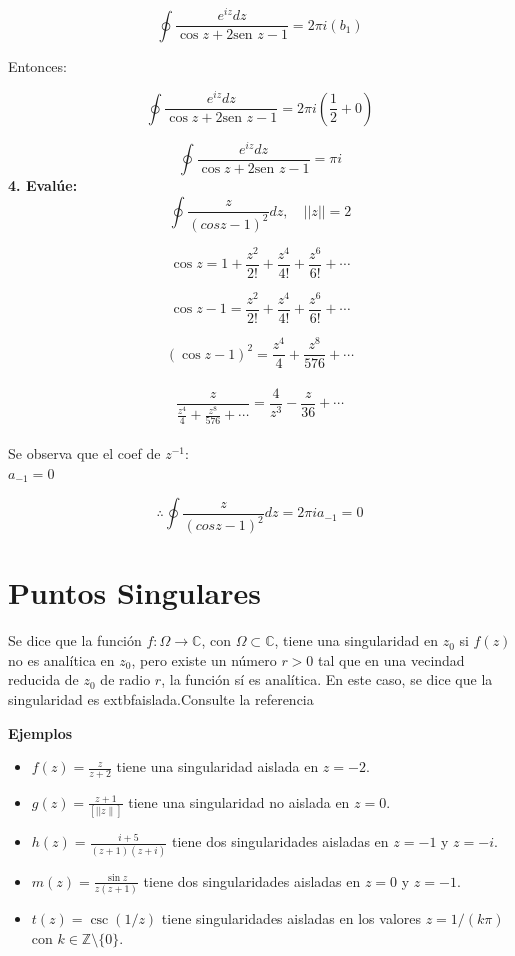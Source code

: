 \documentclass[a4paper,12pt]{article}
\begin{document}
\[
\oint \frac{e^{iz} dz}{\cos z + 2\text{sen } z - 1} = 2\pi i (b_1)
\]

Entonces:

\[
\oint \frac{e^{iz} dz}{\cos z + 2\text{sen } z - 1} = 2\pi i (\frac{1}{2} + 0)
\]

\[
\oint \frac{e^{iz} dz}{\cos z + 2\text{sen } z - 1} = \pi i
\]
\textbf{4. Evalúe:}\\
\[
\oint \frac{z}{(cosz-1)^2}dz, \quad ||z|| = 2
\]

\[
\cos z = 1 + \frac{z^2}{2!} + \frac{z^4}{4!} + \frac{z^6}{6!} + \cdots
\]

\[
\cos z - 1 = \frac{z^2}{2!} + \frac{z^4}{4!} + \frac{z^6}{6!} + \cdots
\]

\[
(\cos z - 1)^2 = \frac{z^4}{4} + \frac{z^8}{576} + \cdots
\]\\
\[
\frac{z}{\frac{z^4}{4} + \frac{z^8}{576} + \cdots}=\frac{4}{z^3}-\frac{z}{36}+ \cdots
\]\\

Se observa que el coef de \(z^{-1}\):\\
\(a_{-1} = 0\)

\[
\therefore \oint \frac{z}{(cosz-1)^2}dz = 2\pi i a_{-1} = 0
\]
\newpage
\section{Puntos Singulares}
Se dice que la función $f: \Omega \to \mathbb{C}$, con $\Omega \subset \mathbb{C}$, tiene una singularidad en $z_0$ si $f(z)$ no es analítica en $z_0$, pero existe un número $r > 0$ tal que en una vecindad reducida de $z_0$ de radio $r$, la función sí es analítica. En este caso, se dice que la singularidad es 	extbf{aislada}.Consulte la referencia \cite{Karunakaran2005}

{\bf \large Ejemplos}
\begin{itemize}
    \item $f(z) = \frac{z}{z+2}$ tiene una singularidad aislada en $z=-2$.
    \item $g(z) = \frac{z+1}{ [||z\|]}$ tiene una singularidad no aislada en $z=0$.
    \item $h(z) = \frac{i+5}{(z+1)(z+i)}$ tiene dos singularidades aisladas en $z=-1$ y $z=-i$.
    \item $m(z) = \frac{\sin z}{z(z+1)}$ tiene dos singularidades aisladas en $z=0$ y $z=-1$.
    \item $t(z) = \csc(1/z)$ tiene singularidades aisladas en los valores $z = 1/(k\pi)$ con $k \in \mathbb{Z}\setminus \{0\}$.
\end{itemize}
\end{document}
